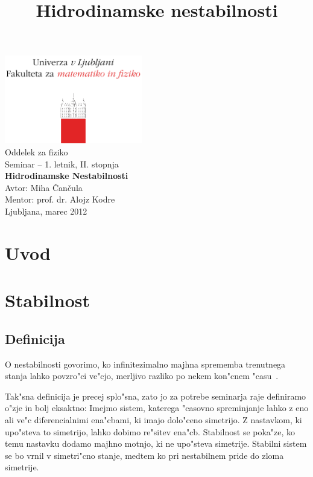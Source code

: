 \documentclass[a4paper,10pt]{article}
\title{Hidrodinamske nestabilnosti}
\begin{document}
\begin{center}
\includegraphics[width=6cm]{../logo_fmf_uni-lj_sl}\\[0.5cm]
Oddelek za fiziko \\[2cm]
{ \large Seminar -- 1. letnik, II. stopnja } \\[1cm]
{ \huge \bf Hidrodinamske Nestabilnosti}\\[2cm]
{\large Avtor: Miha \v Can\v cula}\\[0.6cm]
{\large Mentor: prof. dr. Alojz Kodre} \\[0.6cm]
{\large Ljubljana, marec 2012}
\end{center}
\vfill

\begin{abstract}

\end{abstract}

\section{Uvod}

\section{Stabilnost}

\subsection{Definicija}

O nestabilnosti govorimo, ko infinitezimalno majhna sprememba trenutnega stanja lahko povzro"ci ve"cjo, merljivo razliko po nekem kon"cnem "casu~\cite{drazin}. 

Tak"sna definicija je precej splo"sna, zato jo za potrebe seminarja raje definiramo o"zje in bolj eksaktno: Imejmo sistem, katerega "casovno spreminjanje lahko z eno ali ve"c diferencialnimi ena"cbami, ki imajo dolo"ceno simetrijo. Z nastavkom, ki upo"steva to simetrijo, lahko dobimo re"sitev ena"cb. Stabilnost se poka"ze, ko temu nastavku dodamo majhno motnjo, ki ne upo"steva simetrije. Stabilni sistem se bo vrnil v simetri"cno stanje, medtem ko pri nestabilnem pride do zloma simetrije. 
\end{document}
